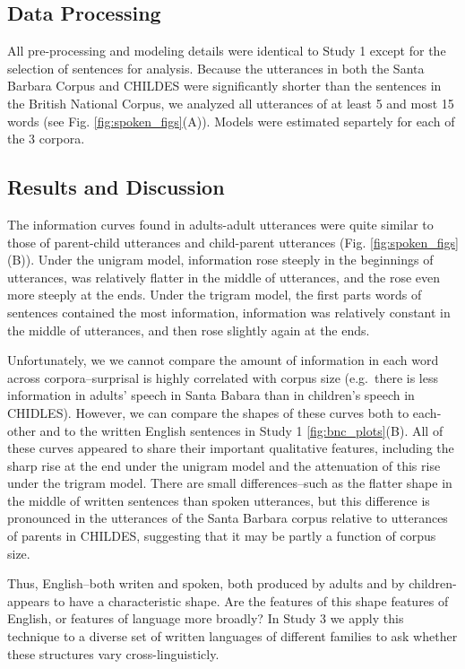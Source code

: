 \documentclass[10pt, letterpaper]{article}
\begin{document}
\hypertarget{data-processing}{%
\subsection{Data Processing}\label{data-processing}}

All pre-processing and modeling details were identical to Study 1 except
for the selection of sentences for analysis. Because the utterances in
both the Santa Barbara Corpus and CHILDES were significantly shorter
than the sentences in the British National Corpus, we analyzed all
utterances of at least 5 and most 15 words (see Fig.
\ref{fig:spoken_figs}(A)). Models were estimated separtely for each of
the 3 corpora.

\hypertarget{results-and-discussion-1}{%
\subsection{Results and Discussion}\label{results-and-discussion-1}}

The information curves found in adults-adult utterances were quite
similar to those of parent-child utterances and child-parent utterances
(Fig. \ref{fig:spoken_figs}(B)). Under the unigram model, information
rose steeply in the beginnings of utterances, was relatively flatter in
the middle of utterances, and the rose even more steeply at the ends.
Under the trigram model, the first parts words of sentences contained
the most information, information was relatively constant in the middle
of utterances, and then rose slightly again at the ends.

Unfortunately, we we cannot compare the amount of information in each
word across corpora--surprisal is highly correlated with corpus size
(e.g.~there is less information in adults' speech in Santa Babara than
in children's speech in CHIDLES). However, we can compare the shapes of
these curves both to each-other and to the written English sentences in
Study 1 \ref{fig:bnc_plots}(B). All of these curves appeared to share
their important qualitative features, including the sharp rise at the
end under the unigram model and the attenuation of this rise under the
trigram model. There are small differences--such as the flatter shape in
the middle of written sentences than spoken utterances, but this
difference is pronounced in the utterances of the Santa Barbara corpus
relative to utterances of parents in CHILDES, suggesting that it may be
partly a function of corpus size.

Thus, English--both writen and spoken, both produced by adults and by
children-appears to have a characteristic shape. Are the features of
this shape features of English, or features of language more broadly? In
Study 3 we apply this technique to a diverse set of written languages of
different families to ask whether these structures vary
cross-linguisticly.
\end{document}
